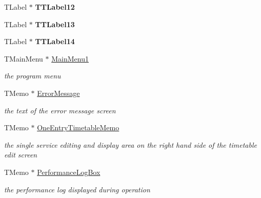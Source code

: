 \begin{DoxyCompactItemize}
T\+Label $\ast$ {\bfseries T\+T\+Label12}
\item 
\mbox{\label{class_t_interface_ade4fe95a6c59702dc6c9d0c771bfdf93}} 
T\+Label $\ast$ {\bfseries T\+T\+Label13}
\item 
\mbox{\label{class_t_interface_af39e6390607a6576a23435b9059a0145}} 
T\+Label $\ast$ {\bfseries T\+T\+Label14}
\item 
\mbox{\label{class_t_interface_ac0defbc28edeb49db14e81c2084341cf}} 
T\+Main\+Menu $\ast$ \mbox{\hyperlink{class_t_interface_ac0defbc28edeb49db14e81c2084341cf}{Main\+Menu1}}
\begin{DoxyCompactList}\small\item\em the program menu \end{DoxyCompactList}\item 
\mbox{\label{class_t_interface_a119ec238c21ed011f11764d77c6c20b6}} 
T\+Memo $\ast$ \mbox{\hyperlink{class_t_interface_a119ec238c21ed011f11764d77c6c20b6}{Error\+Message}}
\begin{DoxyCompactList}\small\item\em the text of the error message screen \end{DoxyCompactList}\item 
\mbox{\label{class_t_interface_ad3adbf556bff0b01b12be33a595373fb}} 
T\+Memo $\ast$ \mbox{\hyperlink{class_t_interface_ad3adbf556bff0b01b12be33a595373fb}{One\+Entry\+Timetable\+Memo}}
\begin{DoxyCompactList}\small\item\em the single service editing and display area on the right hand side of the timetable edit screen \end{DoxyCompactList}\item 
\mbox{\label{class_t_interface_a76addd0eae1d81ecc29d7109aa1da54c}} 
T\+Memo $\ast$ \mbox{\hyperlink{class_t_interface_a76addd0eae1d81ecc29d7109aa1da54c}{Performance\+Log\+Box}}
\begin{DoxyCompactList}\small\item\em the performance log displayed during operation \end{DoxyCompactList}\item 
\mbox{\label{class_t_interface_a5f4cdf54d45ef2756fbcc7c1faeb7751}} 

\end{DoxyCompactItemize}
